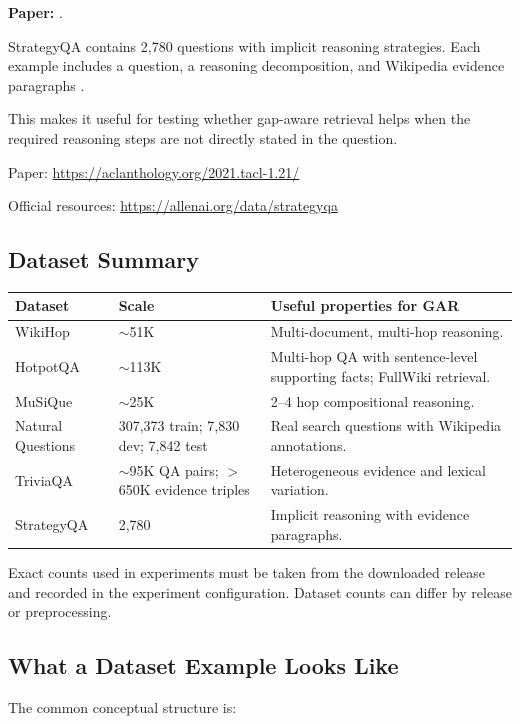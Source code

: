 \documentclass[11pt,a4paper]{article}
\begin{document}
\textbf{Paper:} \citet{geva-etal-2021-strategyqa}.

StrategyQA contains 2,780 questions with implicit reasoning strategies. Each example includes a question, a reasoning decomposition, and Wikipedia evidence paragraphs \citep{geva-etal-2021-strategyqa}.

This makes it useful for testing whether gap-aware retrieval helps when the required reasoning steps are not directly stated in the question.

Paper:
\url{https://aclanthology.org/2021.tacl-1.21/}

Official resources:
\url{https://allenai.org/data/strategyqa}

\subsection{Dataset Summary}

\begin{center}
\small
\begin{tabular}{p{2.7cm}p{2.5cm}p{7.3cm}}
\toprule
\textbf{Dataset} & \textbf{Scale} & \textbf{Useful properties for GAR}\\
\midrule
WikiHop & $\sim$51K & Multi-document, multi-hop reasoning.\\
HotpotQA & $\sim$113K & Multi-hop QA with sentence-level supporting facts; FullWiki retrieval.\\
MuSiQue & $\sim$25K & 2--4 hop compositional reasoning.\\
Natural Questions & 307,373 train; 7,830 dev; 7,842 test & Real search questions with Wikipedia annotations.\\
TriviaQA & $\sim$95K QA pairs; $>$650K evidence triples & Heterogeneous evidence and lexical variation.\\
StrategyQA & 2,780 & Implicit reasoning with evidence paragraphs.\\
\bottomrule
\end{tabular}
\end{center}

Exact counts used in experiments must be taken from the downloaded release and recorded in the experiment configuration. Dataset counts can differ by release or preprocessing.

\subsection{What a Dataset Example Looks Like}

The common conceptual structure is:
\end{document}

